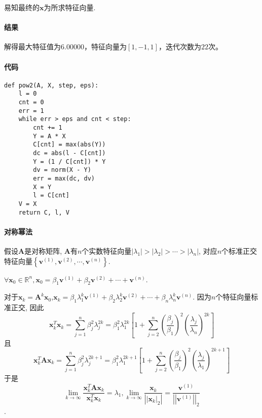 易知最终的$\mathbf{x}$为所求特征向量.

\paragraph{结果}

解得最大特征值为$6.00000$，特征向量为$[1,-1,1]$，迭代次数为$22$次。

\paragraph{代码}

\begin{verbatim}
def pow2(A, X, step, eps):
    l = 0
    cnt = 0
    err = 1
    while err > eps and cnt < step:
        cnt += 1
        Y = A * X
        C[cnt] = max(abs(Y))
        dc = abs(l - C[cnt])
        Y = (1 / C[cnt]) * Y
        dv = norm(X - Y)
        err = max(dc, dv)
        X = Y
        l = C[cnt]
    V = X
    return C, l, V
\end{verbatim}

\paragraph{对称幂法}
假设$\mathbf{A}$是对称矩阵, $\mathbf{A}$有$n$个实数特征向量$\left|\lambda_1 \right| > \left|\lambda_2 \right| > \cdots > \left|\lambda_n \right|$, 对应$n$个标准正交特征向量$\left\{\mathbf{v}^{\left(1\right)}, \mathbf{v}^{\left(2\right)}, \cdots, \mathbf{v}^{\left(n\right)} \right\}$. 

$\forall \mathbf{x}_0 \in \mathbb{R}^{n}, \mathbf{x}_0 = \beta_1 \mathbf{v}^{\left(1\right)} + \beta_2 \mathbf{v}^{\left(2\right)} + \cdots + \mathbf{v}^{\left(n\right)}$.

对于$\mathbf{x}_k = \mathbf{A}^k \mathbf{x}_0$,$\mathbf{x}_k = \beta_1 \lambda_1^k \mathbf{v}^{\left(1\right)} + \beta_2 \lambda_2^k \mathbf{v}^{\left(2\right)} + \cdots + \beta_n \lambda_n^k \mathbf{v}^{\left(n\right)}$.
因为$n$个特征向量标准正交, 因此
$$\mathbf{x}_k^T \mathbf{x}_k = \sum_{j=1}^{n} \beta_j^2 \lambda_j^{2k} = \beta_1^2 \lambda_1^{2k} \left[1 + \sum_{j=2}^{n}\left(\frac{\beta_j}{\beta_1}\right)^2 \left(\frac{\lambda_j}{\lambda_n} \right)^{2k} \right]$$
且
$$ \mathbf{x}_k^{T} \mathbf{A} \mathbf{x}_k = \sum_{j=1}^{n} \beta_j^2 \lambda_j^{2k+1} = \beta_1^2 \lambda_1^{2k+1} \left[ 1 + \sum_{j=2}^{n} \left(\frac{\beta_j}{\beta_1}\right)^2 \left(\frac{\lambda_j}{\lambda_1}\right)^{2k+1} \right] $$
于是
$$\lim\limits_{k \to \infty} \frac{\mathbf{x}_k^T \mathbf{A} \mathbf{x}_k}{\mathbf{x}_k^T \mathbf{x}_k} = \lambda_1, \lim\limits_{k \to \infty} \frac{\mathbf{x}_k}{\left|\left|\mathbf{x}_k \right|_{2} \right|} = \frac{\mathbf{v}^{\left(1\right)}}{\left|\left|\mathbf{v}^{\left(1\right)} \right| \right|_2}$$.

